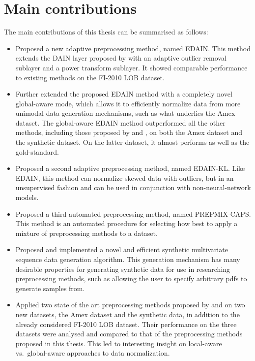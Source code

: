 \documentclass{statsmsc}
\begin{document}
{%


\section{Main contributions}%
\label{sec:Main contributions}

The main contributions of this thesis can be summarised as follows:
\begin{itemize}
    \item Proposed a new adaptive preprocessing method, named \ac{EDAIN}.
        This method extends the \ac{DAIN} layer proposed by \cite{dain} with an
        adaptive outlier removal sublayer and a power transform sublayer. It showed comparable
        performance to existing methods on the FI-2010 \ac{LOB} dataset.
    \item Further extended the proposed \ac{EDAIN} method with a completely novel global-aware
        mode, which allows it to efficiently normalize data from more unimodal data generation
        mechanisms, such as what underlies the Amex dataset. The global-aware \ac{EDAIN} method
        outperformed all the other methods, including those proposed by \cite{dain} and
        \cite{bin}, on both the Amex dataset and the synthetic dataset. On the latter dataset,
        it almost performs as well as the gold-standard.
    \item Proposed a second adaptive preprocessing method, named \ac{EDAIN-KL}.
        Like \ac{EDAIN}, this method can normalize skewed data with outliers, but
        in an unsupervised fashion and can be used in conjunction with non-neural-network models.
    \item Proposed a third automated preprocessing method, named \ac{PREPMIX-CAPS}.
        This method is an automated procedure for selecting how best to apply a
        mixture of preprocessing methods to a dataset.
    \item Proposed and implemented a novel and efficient synthetic multivariate
        sequence data generation algorithm. This generation mechanism has many
        desirable properties for generating synthetic data for use in researching
        preprocessing methods, such as allowing the user to specify arbitrary
        \acp{pdf} to generate samples from.
    \item Applied two state of the art preprocessing methods proposed by \cite{dain} and \cite{bin}
        on two new datasets, the Amex dataset and the synthetic data, in
        addition to the already considered FI-2010 \ac{LOB} dataset. Their performance
        on the three datasets were analysed and compared to that of the
        preprocessing methods proposed in this thesis. This led to interesting insight on
        local-aware vs.\ global-aware approaches to data normalization.
\end{itemize}

}
\end{document}
